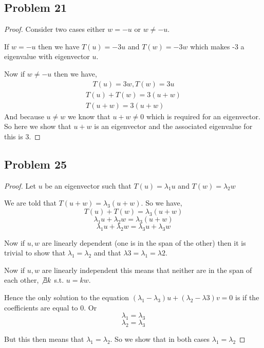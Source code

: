 \documentclass[a4paper]{report}
\begin{document}
 \subsection*{Problem 21}
 \begin{proof}
    
 Consider two cases either  $w = -u$ or $w \ne -u$.

 If  $w = -u$ then we have $T(u) = -3u$ and  $T(w) = -3w$ which makes -3 a eigenvalue with eigenvector $u$.

 Now if $w \ne -u$ then  we have, 
 \begin{align*}
   T(u) = 3w, T(w) = 3u     
 \end{align*}
 \begin{align*}
    T(u) + T(w) = 3(u + w)\\
    T(u + w) = 3 (u + w)
 \end{align*}
 And because $u \ne w$ we know that $u + w \ne 0$ which is required  for an eigenvector. So here we show that $u + w$ is an eigenvector and the associated eigenvalue for this is $3$.


 \end{proof}
 \subsection*{Problem 25}
 \begin{proof}
    
 Let $u$ be an eigenvector such that $T(u) = \lambda_1 u$ and $T(w) = \lambda_2 w$

 We are told that $T(u + w) = \lambda_3(u + w)$. So we have, 
 $$ T(u) + T(w) = \lambda_3(u + w) $$ 
 $$ \lambda_1 u + \lambda_2 w = \lambda_3(u + w) $$ 
 $$ \lambda_1 u  + \lambda_2 w = \lambda_3 u + \lambda_3 w $$ 

 Now if $u,w$ are linearly dependent (one is in the span of the other) then it is trivial to show that $\lambda_1 = \lambda_2$ and that $\lambda 3 = \lambda_1 = \lambda 2$.

 Now if $u,w$ are linearly independent this means that neither are in the span of each other, $\not \exists k $ s.t. $u = kw$.

 Hence the only solution to the equation  $(\lambda_1 - \lambda_3) u + (\lambda_2 - \lambda 3)v = 0$ is if the coefficients are equal to 0. Or 
 $$ \lambda_1 = \lambda_3 $$ 
 $$ \lambda_2 = \lambda_3 $$ 

 But this then means that $\lambda_1= \lambda_2$. So we show that in both cases $\lambda_1 = \lambda_2$

 \end{proof}
\end{document}
